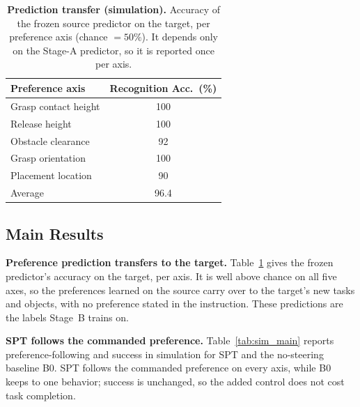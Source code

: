 \documentclass{article}
\begin{document}
\begin{table}[t]
  \centering
  \small
  \caption{\textbf{Prediction transfer (simulation).} Accuracy of the frozen
  source predictor on the target, per preference axis (chance $=50\%$). It
  depends only on the Stage-A predictor, so it is reported once per axis.}
  \label{tab:sim_recognition}
  \begin{tabular}{lc}
    \hline
    Preference axis & Recognition Acc.\ (\%) \\
    \hline
    Grasp contact height & 100 \\
    Release height       & 100 \\
    Obstacle clearance   & 92 \\
    Grasp orientation    & 100 \\
    Placement location   & 90 \\
    \hline
    Average              & 96.4 \\
    \hline
  \end{tabular}
\end{table}


\subsection{Main Results}
\label{sec:exp-main}

\textbf{Preference prediction transfers to the target.}
Table~\ref{tab:sim_recognition} gives the frozen predictor's accuracy on the
target, per axis. It is well above chance on all five axes, so the preferences
learned on the source carry over to the target's new tasks and objects, with no
preference stated in the instruction. These predictions are the labels Stage~B
trains on.

\textbf{SPT follows the commanded preference.}
Table~\ref{tab:sim_main} reports preference-following and success in simulation
for SPT and the no-steering baseline B0. SPT follows the commanded preference on
every axis, while B0 keeps to one behavior; success is unchanged, so the added
control does not cost task completion. 
\end{document}
